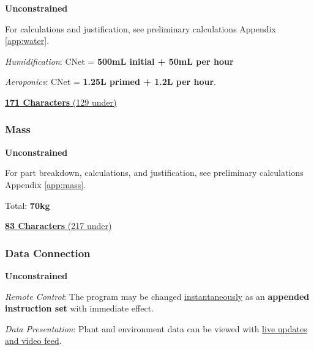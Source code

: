 \documentclass{report}
\begin{document}
\textbf{Unconstrained}

For calculations and justification, see preliminary calculations Appendix \ref{app:water}.

\textit{Humidification}: CNet = \textbf{500mL initial + 50mL per hour}

\textit{Aeroponics}: CNet = \textbf{1.25L primed + 1.2L per hour}.

\uline{\textbf{171 Characters} (129 under)}

\vspace{0.5cm}

\subsubsection{Mass} 
\label{sec:constraints-mass}

\textbf{Unconstrained}

For part breakdown, calculations, and justification, see preliminary calculations Appendix \ref{app:mass}.

Total: \textbf{70kg}

\uline{\textbf{83 Characters} (217 under)}

\vspace{0.5cm}

\subsubsection{Data Connection} 
\label{sec:constraints-data}

\textbf{Unconstrained}

\textit{Remote Control}: The program may be changed \uline{instantaneously} as an \textbf{appended instruction set} with immediate effect.

\textit{Data Presentation}: Plant and environment data can be viewed with \uline{live updates and video feed}.
\end{document}
